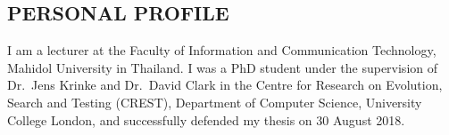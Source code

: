 \documentclass[margin, 10pt]{res} %
\begin{document}
\begin{resume}

 



\section{PERSONAL PROFILE}  

I am a lecturer at the Faculty of Information and Communication Technology, Mahidol University in Thailand. I was a PhD student under the supervision of Dr.~Jens Krinke and Dr.~David Clark in the Centre for Research on Evolution, Search and Testing (CREST), Department of Computer Science, University College London, and successfully defended my thesis on 30\textsuperscript{} August 2018. 





\end{resume}
\end{document}
